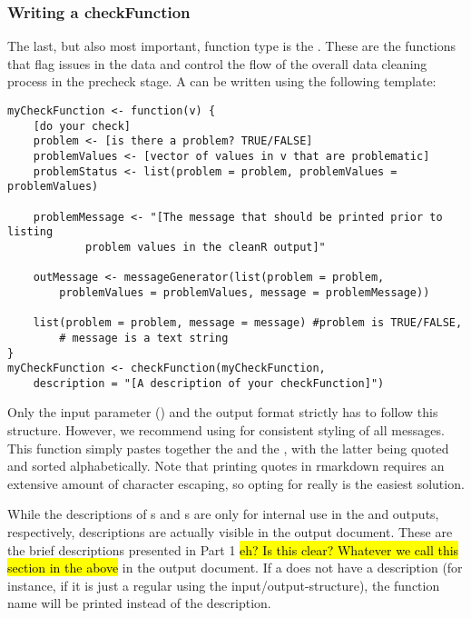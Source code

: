 \documentclass[article]{jss}
\begin{document}
\subsubsection{Writing a checkFunction}
The last, but also most important,  function type is the . These are the functions that flag issues in the data and control the flow of the overall data cleaning process in the precheck stage. A  can be written using the following template:
\begin{Verbatim}
myCheckFunction <- function(v) {
	[do your check]
	problem <- [is there a problem? TRUE/FALSE]
	problemValues <- [vector of values in v that are problematic]
	problemStatus <- list(problem = problem, problemValues = problemValues)

	problemMessage <- "[The message that should be printed prior to listing
			problem values in the cleanR output]"

	outMessage <- messageGenerator(list(problem = problem,
		problemValues = problemValues, message = problemMessage))

	list(problem = problem, message = message) #problem is TRUE/FALSE,
		# message is a text string
}
myCheckFunction <- checkFunction(myCheckFunction,
	description = "[A description of your checkFunction]")
\end{Verbatim}
Only the input parameter () and the output format strictly has to follow this structure. However, we recommend using  for consistent styling of all  messages. This function simply pastes together the  and the , with the latter being quoted and sorted alphabetically. Note that printing quotes in rmarkdown requires an extensive amount of character escaping, so opting for  really is the easiest solution.

While the descriptions of s and s are only for internal use in the  and  outputs, respectively,  descriptions are actually visible in the  output document. These are the brief descriptions presented in Part 1 \hl{eh? Is this clear? Whatever we call this section in the above} in the output document. If a  does not have a description (for instance, if it is just a regular  using the  input/output-structure), the function name will be printed instead of the description.
\end{document}
